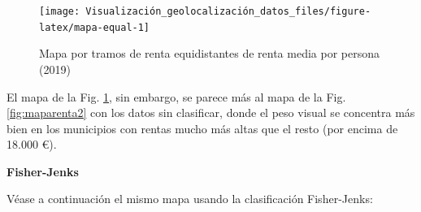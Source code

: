 \documentclass[
]{book}
\newenvironment{Shaded}{\begin{snugshade}}{\end{snugshade}}
\newcommand{\AttributeTok}[1]{\textcolor[rgb]{0.77,0.63,0.00}{#1}}
\newcommand{\CommentTok}[1]{\textcolor[rgb]{0.56,0.35,0.01}{\textit{#1}}}
\newcommand{\ConstantTok}[1]{\textcolor[rgb]{0.00,0.00,0.00}{#1}}
\newcommand{\FunctionTok}[1]{\textcolor[rgb]{0.00,0.00,0.00}{#1}}
\newcommand{\NormalTok}[1]{#1}
\newcommand{\OtherTok}[1]{\textcolor[rgb]{0.56,0.35,0.01}{#1}}
\newcommand{\SpecialCharTok}[1]{\textcolor[rgb]{0.00,0.00,0.00}{#1}}
\newcommand{\StringTok}[1]{\textcolor[rgb]{0.31,0.60,0.02}{#1}}
\theoremstyle{definition}
\theoremstyle{definition}
\theoremstyle{definition}
\theoremstyle{definition}
\theoremstyle{remark}
\begin{document}
\begin{figure}

{\centering \texttt{[image: Visualización\_geolocalización\_datos\_files/figure-latex/mapa-equal-1]} 

}

\caption{Mapa por tramos de renta equidistantes de renta media por persona (2019)}\label{fig:mapa-equal}
\end{figure}

El mapa de la Fig. \ref{fig:mapa-equal}, sin embargo, se parece más al mapa de
la Fig. \ref{fig:maparenta2} con los datos sin clasificar, donde el peso visual
se concentra más bien en los municipios con rentas mucho más altas que el resto
(por encima de 18.000 €).

\textbf{Fisher-Jenks}

Véase a continuación el mismo mapa usando la clasificación Fisher-Jenks:

\begin{Shaded}
\end{Shaded}
\end{document}

